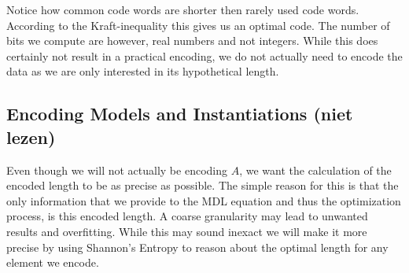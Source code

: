 \documentclass{llncs}
\begin{document}
Notice how common code words are shorter then rarely used code words. According to the Kraft-inequality this gives us an optimal code. The number of bits we compute are however, real numbers and not integers. While this does certainly not result in a practical encoding, we do not actually need to encode the data as we are only interested in its hypothetical length.

\subsection{Encoding Models and Instantiations (niet lezen)}
Even though we will not actually be encoding $A$, we want the calculation of the encoded length to be as precise as possible. The simple reason for this is that the only information that we provide to the MDL equation and thus the optimization process, is this encoded length. A coarse granularity may lead to unwanted results and overfitting. While this may sound inexact we will  make it more precise by using Shannon's Entropy to reason about the optimal length for any element we encode.
\end{document}
